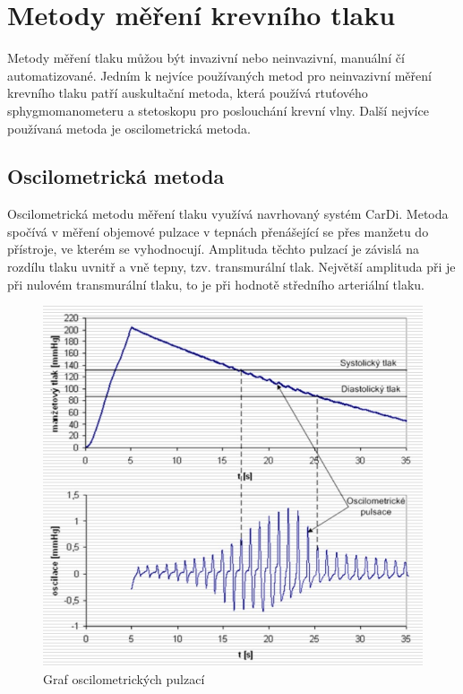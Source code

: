 \section{Metody měření krevního tlaku}
Metody měření tlaku můžou být invazivní nebo neinvazivní, manuální čí automatizované. Jedním k nejvíce používaných metod pro neinvazivní měření
krevního tlaku patří auskultační metoda, která používá rtuťového sphygmomanometeru a stetoskopu pro poslouchání krevní vlny. Další nejvíce používaná metoda je oscilometrická metoda.
\subsection{Oscilometrická metoda}
Oscilometrická metodu měření tlaku využívá navrhovaný systém CarDi. Metoda spočívá v měření objemové pulzace v tepnách přenášející se přes manžetu do přístroje, ve kterém se vyhodnocují.
Amplituda těchto pulzací je závislá na rozdílu tlaku uvnitř a vně tepny, tzv. transmurální tlak. Největší amplituda při je při nulovém transmurální tlaku, to je při hodnotě středního arteriální tlaku.

\begin{figure}[H]
    \caption{Graf oscilometrických pulzací}
    \includegraphics[width=1\textwidth]{pictures/oscilometricky_tlak.jpg}
\end{figure}
